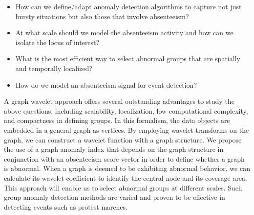 \begin{itemize}
\item How can we define/adapt anomaly detection algorithms to capture not just bursty situations
but also those that involve absenteeism?
\item At what scale should we model the absenteeism activity and how can we isolate the locus of
interest?
\item What is the most efficient way to select abnormal groups that are spatially and temporally localized?
\item How do we model an absenteeism signal for event detection?
\end{itemize}

A graph wavelet approach offers several outstanding advantages to study the above questions, including scalability, localization, low computational complexity, and
compactness in defining groups. In this formalism, the data objects are embedded in a general graph as vertices. By employing wavelet transforms on the graph, we can construct a wavelet function with a graph structure. We propose the use of a graph anomaly index that depends on the graph structure in conjunction with an absenteeism score vector in order to define whether a graph is abnormal. When a graph is deemed to be exhibiting abnormal behavior, we can calculate its wavelet coefficient to identify the central node and its coverage area. This approach will enable us to select abnormal groups at different scales. Such group anomaly detection methods are varied and proven to be effective in detecting events such as protest marches.


